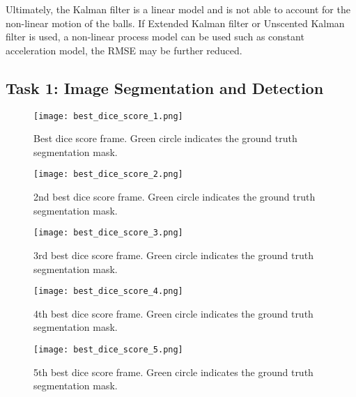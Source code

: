 \documentclass{report}
\begin{document}
Ultimately, the Kalman filter is a linear model and is not able to account for the non-linear motion of the balls. If Extended Kalman filter or Unscented Kalman filter is used, a non-linear process model can be used such as constant acceleration model, the RMSE may be further reduced.

\printbibliography

\begin{appendices}

\chapter{Task 1: Image Segmentation and Detection}\label{sec:app_task1}


\begin{figure}
    \centering
    \texttt{[image: best\_dice\_score\_1.png]}
    \caption{Best dice score frame. Green circle indicates the ground truth segmentation mask.}
\end{figure}
\begin{figure}
    \centering
    \texttt{[image: best\_dice\_score\_2.png]}
    \caption{2nd best dice score frame. Green circle indicates the ground truth segmentation mask.}
\end{figure}
\begin{figure}
    \centering
    \texttt{[image: best\_dice\_score\_3.png]}
    \caption{3rd best dice score frame. Green circle indicates the ground truth segmentation mask.}
\end{figure}
\begin{figure}
    \centering
    \texttt{[image: best\_dice\_score\_4.png]}
    \caption{4th best dice score frame. Green circle indicates the ground truth segmentation mask.}
\end{figure}
\begin{figure}
    \centering
    \texttt{[image: best\_dice\_score\_5.png]}
    \caption{5th best dice score frame. Green circle indicates the ground truth segmentation mask.}
\end{figure}


\end{appendices}
\end{document}
